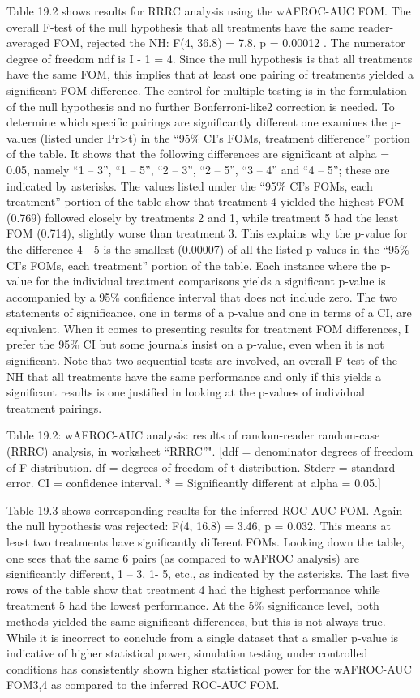 \documentclass[
]{book}
\begin{document}
Table 19.2 shows results for RRRC analysis using the wAFROC-AUC FOM. The overall F-test of the null hypothesis that all treatments have the same reader-averaged FOM, rejected the NH: F(4, 36.8) = 7.8, p = 0.00012 . The numerator degree of freedom ndf is I - 1 = 4. Since the null hypothesis is that all treatments have the same FOM, this implies that at least one pairing of treatments yielded a significant FOM difference. The control for multiple testing is in the formulation of the null hypothesis and no further Bonferroni-like2 correction is needed. To determine which specific pairings are significantly different one examines the p-values (listed under Pr\textgreater t) in the ``95\% CI's FOMs, treatment difference'' portion of the table. It shows that the following differences are significant at alpha = 0.05, namely ``1 -- 3'', ``1 -- 5'', ``2 -- 3'', ``2 -- 5'', ``3 -- 4'' and ``4 -- 5''; these are indicated by asterisks. The values listed under the ``95\% CI's FOMs, each treatment'' portion of the table show that treatment 4 yielded the highest FOM (0.769) followed closely by treatments 2 and 1, while treatment 5 had the least FOM (0.714), slightly worse than treatment 3. This explains why the p-value for the difference 4 - 5 is the smallest (0.00007) of all the listed p-values in the ``95\% CI's FOMs, each treatment'' portion of the table. Each instance where the p-value for the individual treatment comparisons yields a significant p-value is accompanied by a 95\% confidence interval that does not include zero. The two statements of significance, one in terms of a p-value and one in terms of a CI, are equivalent. When it comes to presenting results for treatment FOM differences, I prefer the 95\% CI but some journals insist on a p-value, even when it is not significant. Note that two sequential tests are involved, an overall F-test of the NH that all treatments have the same performance and only if this yields a significant results is one justified in looking at the p-values of individual treatment pairings.

Table 19.2: wAFROC-AUC analysis: results of random-reader random-case (RRRC) analysis, in worksheet ``RRRC''". {[}ddf = denominator degrees of freedom of F-distribution. df = degrees of freedom of t-distribution. Stderr = standard error. CI = confidence interval. * = Significantly different at alpha = 0.05.{]}

Table 19.3 shows corresponding results for the inferred ROC-AUC FOM. Again the null hypothesis was rejected: F(4, 16.8) = 3.46, p = 0.032. This means at least two treatments have significantly different FOMs. Looking down the table, one sees that the same 6 pairs (as compared to wAFROC analysis) are significantly different, 1 -- 3, 1- 5, etc., as indicated by the asterisks. The last five rows of the table show that treatment 4 had the highest performance while treatment 5 had the lowest performance. At the 5\% significance level, both methods yielded the same significant differences, but this is not always true. While it is incorrect to conclude from a single dataset that a smaller p-value is indicative of higher statistical power, simulation testing under controlled conditions has consistently shown higher statistical power for the wAFROC-AUC FOM3,4 as compared to the inferred ROC-AUC FOM.
\end{document}
